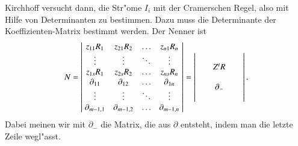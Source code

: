 Kirchhoff versucht dann, die Str"ome $I_i$ mit der Cramerschen 
Regel, also mit Hilfe von Determinanten zu bestimmen.
Dazu muss die Determinante der Koeffizienten-Matrix bestimmt werden.
Der Nenner ist
\begin{equation}
N=\left|\;\begin{matrix}
z_{11}R_1       &z_{21}R_2       &\dots &z_{n1}R_n       \\
\vdots          &\vdots          &\ddots&\vdots          \\
z_{1s}R_1       &z_{2s}R_2       &\dots &z_{ns}R_n       \\
\partial_{11}   &\partial_{12}   &\dots &\partial_{1n}   \\
\vdots          &\vdots          &\ddots&\vdots          \\
\partial_{m-1,1}&\partial_{m-1,2}&\dots &\partial_{m-1,n}
\end{matrix}\;\right|
=
\left|\;
\begin{tabular}{>{$}c<{$}>{$}c<{$}>{$}c<{$}}
&          &\\
&Z^tR      &\\
&          &\\
&\partial_-&\\
&          &
\end{tabular}
\;\right|.
\label{Ndenominator}
\end{equation}
Dabei meinen wir mit $\partial_-$ die Matrix, die aus $\partial$
entsteht, indem man die letzte Zeile wegl"asst.

